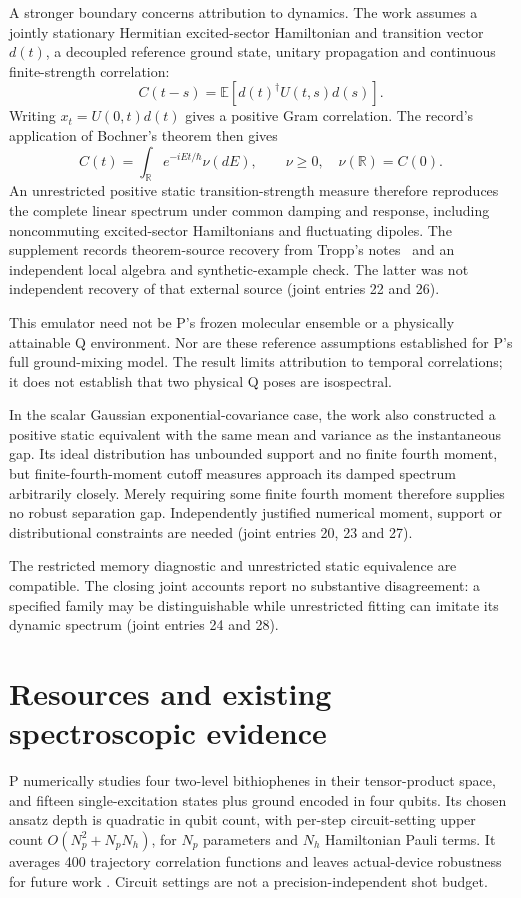 \documentclass{article}
\begin{document}
A stronger boundary concerns attribution to dynamics. The work assumes a jointly stationary Hermitian excited-sector Hamiltonian and transition vector \(d(t)\), a decoupled reference ground state, unitary propagation and continuous finite-strength correlation:
\[
 C(t-s)=\mathbb E[d(t)^\dagger U(t,s)d(s)].
\]
Writing \(x_t=U(0,t)d(t)\) gives a positive Gram correlation. The record's application of Bochner's theorem then gives
\[
 C(t)=\int_{\mathbb R}e^{-iEt/\hbar}\nu(dE),
 \qquad \nu\geq0,\quad \nu(\mathbb R)=C(0).
\]
An unrestricted positive static transition-strength measure therefore reproduces the complete linear spectrum under common damping and response, including noncommuting excited-sector Hamiltonians and fluctuating dipoles. The supplement records theorem-source recovery from Tropp's notes~\cite{Tropp} and an independent local algebra and synthetic-example check. The latter was not independent recovery of that external source (joint entries 22 and 26).

This emulator need not be P's frozen molecular ensemble or a physically attainable Q environment. Nor are these reference assumptions established for P's full ground-mixing model. The result limits attribution to temporal correlations; it does not establish that two physical Q poses are isospectral.

In the scalar Gaussian exponential-covariance case, the work also constructed a positive static equivalent with the same mean and variance as the instantaneous gap. Its ideal distribution has unbounded support and no finite fourth moment, but finite-fourth-moment cutoff measures approach its damped spectrum arbitrarily closely. Merely requiring some finite fourth moment therefore supplies no robust separation gap. Independently justified numerical moment, support or distributional constraints are needed (joint entries 20, 23 and 27).

The restricted memory diagnostic and unrestricted static equivalence are compatible. The closing joint accounts report no substantive disagreement: a specified family may be distinguishable while unrestricted fitting can imitate its dynamic spectrum (joint entries 24 and 28).

\section{Resources and existing spectroscopic evidence}

P numerically studies four two-level bithiophenes in their tensor-product space, and fifteen single-excitation states plus ground encoded in four qubits. Its chosen ansatz depth is quadratic in qubit count, with per-step circuit-setting upper count \(O(N_p^2+N_pN_h)\), for \(N_p\) parameters and \(N_h\) Hamiltonian Pauli terms. It averages 400 trajectory correlation functions and leaves actual-device robustness for future work \cite{P}. Circuit settings are not a precision-independent shot budget.
\end{document}

